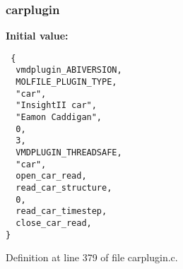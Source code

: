 \subsubsection{ carplugin\hspace{0.3cm}{\tt  [static]}}\label{carplugin_8c_a1}


{\bf Initial value:}

\footnotesize\begin{verbatim} {
  vmdplugin_ABIVERSION,
  MOLFILE_PLUGIN_TYPE,                         
  "car",                                       
  "InsightII car",                             
  "Eamon Caddigan",                            
  0,                                           
  3,                                           
  VMDPLUGIN_THREADSAFE,                        
  "car",
  open_car_read,
  read_car_structure,
  0,
  read_car_timestep,
  close_car_read,
}\end{verbatim}\normalsize 


Definition at line 379 of file carplugin.c.